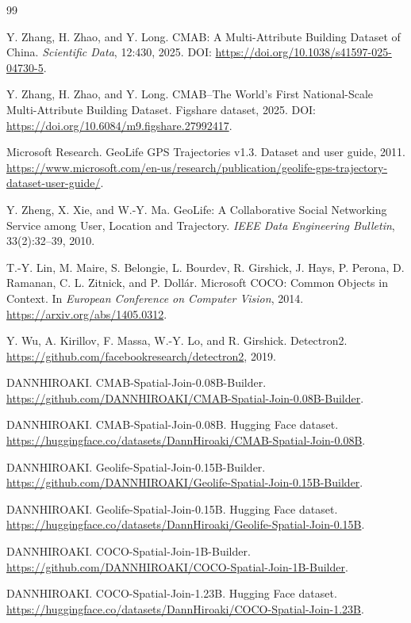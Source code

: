 \documentclass[11pt]{article}
\begin{document}
\begin{thebibliography}{99}

Y. Zhang, H. Zhao, and Y. Long.
\newblock CMAB: A Multi-Attribute Building Dataset of China.
\newblock \emph{Scientific Data}, 12:430, 2025.
\newblock DOI: \url{https://doi.org/10.1038/s41597-025-04730-5}.

Y. Zhang, H. Zhao, and Y. Long.
\newblock CMAB--The World's First National-Scale Multi-Attribute Building Dataset.
\newblock Figshare dataset, 2025.
\newblock DOI: \url{https://doi.org/10.6084/m9.figshare.27992417}.

Microsoft Research.
\newblock GeoLife GPS Trajectories v1.3.
\newblock Dataset and user guide, 2011.
\newblock \url{https://www.microsoft.com/en-us/research/publication/geolife-gps-trajectory-dataset-user-guide/}.

Y. Zheng, X. Xie, and W.-Y. Ma.
\newblock GeoLife: A Collaborative Social Networking Service among User, Location and Trajectory.
\newblock \emph{IEEE Data Engineering Bulletin}, 33(2):32--39, 2010.

T.-Y. Lin, M. Maire, S. Belongie, L. Bourdev, R. Girshick, J. Hays, P. Perona, D. Ramanan, C. L. Zitnick, and P. Doll\'ar.
\newblock Microsoft COCO: Common Objects in Context.
\newblock In \emph{European Conference on Computer Vision}, 2014.
\newblock \url{https://arxiv.org/abs/1405.0312}.

Y. Wu, A. Kirillov, F. Massa, W.-Y. Lo, and R. Girshick.
\newblock Detectron2.
\newblock \url{https://github.com/facebookresearch/detectron2}, 2019.

DANNHIROAKI.
\newblock CMAB-Spatial-Join-0.08B-Builder.
\newblock \url{https://github.com/DANNHIROAKI/CMAB-Spatial-Join-0.08B-Builder}.

DANNHIROAKI.
\newblock CMAB-Spatial-Join-0.08B.
\newblock Hugging Face dataset.
\newblock \url{https://huggingface.co/datasets/DannHiroaki/CMAB-Spatial-Join-0.08B}.

DANNHIROAKI.
\newblock Geolife-Spatial-Join-0.15B-Builder.
\newblock \url{https://github.com/DANNHIROAKI/Geolife-Spatial-Join-0.15B-Builder}.

DANNHIROAKI.
\newblock Geolife-Spatial-Join-0.15B.
\newblock Hugging Face dataset.
\newblock \url{https://huggingface.co/datasets/DannHiroaki/Geolife-Spatial-Join-0.15B}.

DANNHIROAKI.
\newblock COCO-Spatial-Join-1B-Builder.
\newblock \url{https://github.com/DANNHIROAKI/COCO-Spatial-Join-1B-Builder}.

DANNHIROAKI.
\newblock COCO-Spatial-Join-1.23B.
\newblock Hugging Face dataset.
\newblock \url{https://huggingface.co/datasets/DannHiroaki/COCO-Spatial-Join-1.23B}.

\end{thebibliography}
\end{document}
